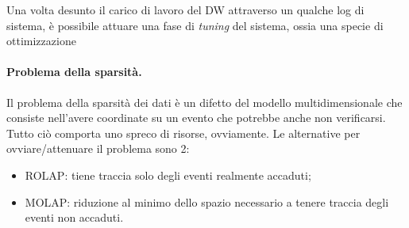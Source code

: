 \documentclass[a4paper, 10pt]{article}
\begin{document}
	Una volta desunto il carico di lavoro del DW attraverso un qualche log di sistema, è possibile attuare una fase di \textit{tuning} del sistema, ossia una specie di ottimizzazione
	
	\paragraph{Problema della sparsità.} Il problema della sparsità dei dati è un difetto del modello multidimensionale che consiste nell'avere coordinate su un evento che potrebbe anche non verificarsi. Tutto ciò comporta uno spreco di risorse, ovviamente. Le alternative per ovviare/attenuare il problema sono 2: \begin{itemize}
		\item ROLAP: tiene traccia solo degli eventi realmente accaduti;
		\item MOLAP: riduzione al minimo dello spazio necessario a tenere traccia degli eventi non accaduti.
	\end{itemize}


	
	
	
	
	
	
	
	
	
	
	
\end{document}
